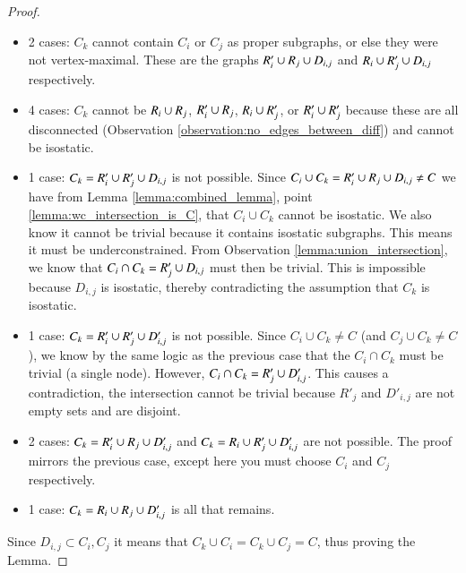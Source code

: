 \begin{proof}
\begin{itemize}
    \item 2 cases: $C_k$ cannot contain $C_i$ or $C_j$ as proper subgraphs, or else they were not vertex-maximal. These are the graphs $R'_i\cup R_j\cup D_{i,j}$ and $R_i\cup R'_j\cup D_{i,j}$ respectively.

    \item 4 cases: \usestwod $C_k$ cannot be $R_i\cup R_j$, $R'_i\cup R_j$, $R_i\cup R'_j$, or $R'_i\cup R'_j$ because these are all disconnected (Observation \ref{observation:no_edges_between_diff}) and cannot be isostatic.

    \item 1 case: $C_k=R'_i\cup R'_j\cup D_{i,j}$ is not possible. Since $C_i\cup C_k = R'_i\cup R_j\cup D_{i,j}\neq C$ we have from Lemma \ref{lemma:combined_lemma}, point \ref{lemma:wc_intersection_is_C}, that $C_i\cup C_k$ cannot be isostatic. We also know it cannot be trivial because it contains isostatic subgraphs. This means it must be underconstrained. From Observation \ref{lemma:union_intersection}, we know that $C_i\cap C_k=R'_j\cup D_{i,j}$ must then be trivial. This is impossible because $D_{i,j}$ is isostatic, thereby contradicting the assumption that $C_k$ is isostatic.

    \item 1 case: \usestwod $C_k=R'_i\cup R'_j\cup D'_{i,j}$ is not possible. Since $C_i\cup C_k\neq C$ (and $C_j\cup C_k\neq C$), we know by the same logic as the previous case that the $C_i\cap C_k$ must be trivial (a single node). However, $C_i\cap C_k=R'_j\cup D'_{i,j}$. This causes a contradiction, the intersection cannot be trivial because $R'_j$ and $D'_{i,j}$ are not empty sets and are disjoint.

    \item 2 cases: \usestwod $C_k=R'_i\cup R_j\cup D'_{i,j}$ and $C_k=R_i\cup R'_j\cup D'_{i,j}$ are not possible. The proof mirrors the previous case, except here you must choose $C_i$ and $C_j$ respectively.

    \item 1 case: $C_k=R_i\cup R_j\cup D'_{i,j}$ is all that remains.
\end{itemize}

Since $D_{i,j}\subset C_i, C_j$ it means that $C_k\cup C_i = C_k \cup C_j = C$, thus proving the Lemma.
%
\end{proof}

